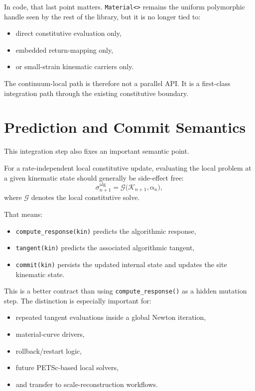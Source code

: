 In code, that last point matters. \texttt{Material<>} remains the uniform
polymorphic handle seen by the rest of the library, but it is no longer tied
to:
\begin{itemize}
  \item direct constitutive evaluation only,
  \item embedded return-mapping only,
  \item or small-strain kinematic carriers only.
\end{itemize}

The continuum-local path is therefore not a parallel API. It is a first-class
integration path through the existing constitutive boundary.

\section{Prediction and Commit Semantics}

This integration step also fixes an important semantic point.

For a rate-independent local constitutive update, evaluating the local problem
at a given kinematic state should generally be side-effect free:
\[
  \sigma_{n+1}^{\text{alg}}
  =
  \mathcal{G}\bigl(\mathcal{K}_{n+1}, \alpha_n\bigr),
\]
where $\mathcal{G}$ denotes the local constitutive solve.

That means:
\begin{itemize}
  \item \texttt{compute\_response(kin)} predicts the algorithmic response,
  \item \texttt{tangent(kin)} predicts the associated algorithmic tangent,
  \item \texttt{commit(kin)} persists the updated internal state and updates
        the site kinematic state.
\end{itemize}

This is a better contract than using \texttt{compute\_response()} as a hidden
mutation step. The distinction is especially important for:
\begin{itemize}
  \item repeated tangent evaluations inside a global Newton iteration,
  \item material-curve drivers,
  \item rollback/restart logic,
  \item future PETSc-based local solvers,
  \item and transfer to scale-reconstruction workflows.
\end{itemize}

